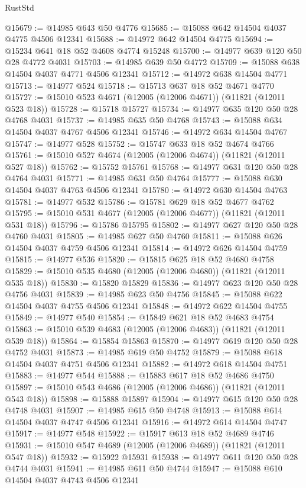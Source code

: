 \begin{lexlean}{RustStd}
\begin{coremodule}
@15679 := @14985 @643 @50 @4776
@15685 := @15088 @642 @14504 @4037 @4775 @4506 @12341
@15688 := @14972 @642 @14504 @4775
@15694 := @15234 @641 @18 @52 @4608 @4774 @15248
@15700 := @14977 @639 @120 @50 @28 @4772 @4031
@15703 := @14985 @639 @50 @4772
@15709 := @15088 @638 @14504 @4037 @4771 @4506 @12341
@15712 := @14972 @638 @14504 @4771
@15713 := @14977 @524
@15718 := @15713 @637 @18 @52 @4671 @4770
@15727 := @15010 @523 @4671 (@12005 (@12006 @4671)) (@11821 (@12011 @523 @18))
@15728 := @15718 @15727
@15734 := @14977 @635 @120 @50 @28 @4768 @4031
@15737 := @14985 @635 @50 @4768
@15743 := @15088 @634 @14504 @4037 @4767 @4506 @12341
@15746 := @14972 @634 @14504 @4767
@15747 := @14977 @528
@15752 := @15747 @633 @18 @52 @4674 @4766
@15761 := @15010 @527 @4674 (@12005 (@12006 @4674)) (@11821 (@12011 @527 @18))
@15762 := @15752 @15761
@15768 := @14977 @631 @120 @50 @28 @4764 @4031
@15771 := @14985 @631 @50 @4764
@15777 := @15088 @630 @14504 @4037 @4763 @4506 @12341
@15780 := @14972 @630 @14504 @4763
@15781 := @14977 @532
@15786 := @15781 @629 @18 @52 @4677 @4762
@15795 := @15010 @531 @4677 (@12005 (@12006 @4677)) (@11821 (@12011 @531 @18))
@15796 := @15786 @15795
@15802 := @14977 @627 @120 @50 @28 @4760 @4031
@15805 := @14985 @627 @50 @4760
@15811 := @15088 @626 @14504 @4037 @4759 @4506 @12341
@15814 := @14972 @626 @14504 @4759
@15815 := @14977 @536
@15820 := @15815 @625 @18 @52 @4680 @4758
@15829 := @15010 @535 @4680 (@12005 (@12006 @4680)) (@11821 (@12011 @535 @18))
@15830 := @15820 @15829
@15836 := @14977 @623 @120 @50 @28 @4756 @4031
@15839 := @14985 @623 @50 @4756
@15845 := @15088 @622 @14504 @4037 @4755 @4506 @12341
@15848 := @14972 @622 @14504 @4755
@15849 := @14977 @540
@15854 := @15849 @621 @18 @52 @4683 @4754
@15863 := @15010 @539 @4683 (@12005 (@12006 @4683)) (@11821 (@12011 @539 @18))
@15864 := @15854 @15863
@15870 := @14977 @619 @120 @50 @28 @4752 @4031
@15873 := @14985 @619 @50 @4752
@15879 := @15088 @618 @14504 @4037 @4751 @4506 @12341
@15882 := @14972 @618 @14504 @4751
@15883 := @14977 @544
@15888 := @15883 @617 @18 @52 @4686 @4750
@15897 := @15010 @543 @4686 (@12005 (@12006 @4686)) (@11821 (@12011 @543 @18))
@15898 := @15888 @15897
@15904 := @14977 @615 @120 @50 @28 @4748 @4031
@15907 := @14985 @615 @50 @4748
@15913 := @15088 @614 @14504 @4037 @4747 @4506 @12341
@15916 := @14972 @614 @14504 @4747
@15917 := @14977 @548
@15922 := @15917 @613 @18 @52 @4689 @4746
@15931 := @15010 @547 @4689 (@12005 (@12006 @4689)) (@11821 (@12011 @547 @18))
@15932 := @15922 @15931
@15938 := @14977 @611 @120 @50 @28 @4744 @4031
@15941 := @14985 @611 @50 @4744
@15947 := @15088 @610 @14504 @4037 @4743 @4506 @12341

\end{coremodule}
\end{lexlean}
